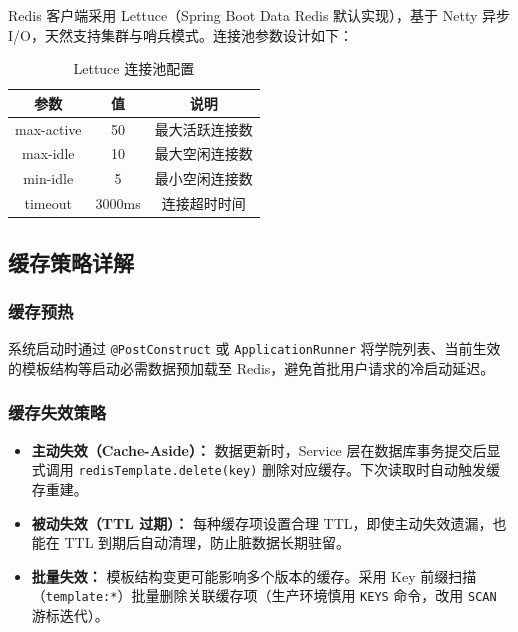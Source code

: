 \documentclass{../softeng}
\begin{document}
Redis 客户端采用 Lettuce（Spring Boot Data Redis 默认实现），基于 Netty 异步 I/O，天然支持集群与哨兵模式。连接池参数设计如下：

\begin{table}[htbp]
\centering
\caption{Lettuce 连接池配置}
\label{tab:lettuce-config}
\begin{tabular}{|c|c|c|}
\hline
\textbf{参数} & \textbf{值} & \textbf{说明} \\
\hline
max-active & 50 & 最大活跃连接数 \\
\hline
max-idle & 10 & 最大空闲连接数 \\
\hline
min-idle & 5 & 最小空闲连接数 \\
\hline
timeout & 3000ms & 连接超时时间 \\
\hline
\end{tabular}
\end{table}

\subsection{缓存策略详解}

\subsubsection{缓存预热}

系统启动时通过 \texttt{@PostConstruct} 或 \texttt{ApplicationRunner} 将学院列表、当前生效的模板结构等启动必需数据预加载至 Redis，避免首批用户请求的冷启动延迟。

\subsubsection{缓存失效策略}

\begin{itemize}
    \item \textbf{主动失效（Cache-Aside）：} 数据更新时，Service 层在数据库事务提交后显式调用 \texttt{redisTemplate.delete(key)} 删除对应缓存。下次读取时自动触发缓存重建。
    \item \textbf{被动失效（TTL 过期）：} 每种缓存项设置合理 TTL，即使主动失效遗漏，也能在 TTL 到期后自动清理，防止脏数据长期驻留。
    \item \textbf{批量失效：} 模板结构变更可能影响多个版本的缓存。采用 Key 前缀扫描（\texttt{template:*}）批量删除关联缓存项（生产环境慎用 \texttt{KEYS} 命令，改用 \texttt{SCAN} 游标迭代）。
\end{itemize}
\end{document}

